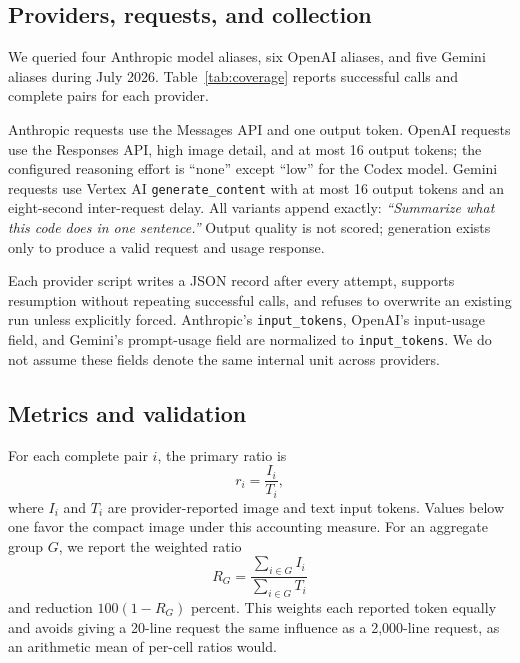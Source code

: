 \documentclass[sigconf,nonacm]{acmart}
\begin{document}
\subsection{Providers, requests, and collection}

We queried four Anthropic model aliases, six OpenAI aliases, and five Gemini
aliases during July 2026. Table~\ref{tab:coverage} reports successful calls and
complete pairs for each provider.

\begin{table}[t]
  \centering
  \caption{Measurement coverage. A complete pair contains successful raw-text
  and compact-image requests for the same provider, model, language, and size.}
  \label{tab:coverage}
  
\end{table}

Anthropic requests use the Messages API and one output token. OpenAI requests
use the Responses API, high image detail, and at most 16 output tokens; the
configured reasoning effort is ``none'' except ``low'' for the Codex model.
Gemini requests use Vertex AI \texttt{generate\_content} with at most 16 output
tokens and an eight-second inter-request delay. All variants append exactly:
\emph{``Summarize what this code does in one sentence.''} Output quality is not
scored; generation exists only to produce a valid request and usage response.

Each provider script writes a JSON record after every attempt, supports
resumption without repeating successful calls, and refuses to overwrite an
existing run unless explicitly forced. Anthropic's \texttt{input\_tokens},
OpenAI's input-usage field, and Gemini's prompt-usage field are normalized to
\texttt{input\_tokens}. We do not assume these fields denote the same internal
unit across providers.

\subsection{Metrics and validation}

For each complete pair $i$, the primary ratio is
\[
  r_i = \frac{I_i}{T_i},
\]
where $I_i$ and $T_i$ are provider-reported image and text input tokens.
Values below one favor the compact image under this accounting measure. For an
aggregate group $G$, we report the weighted ratio
\[
  R_G = \frac{\sum_{i \in G} I_i}{\sum_{i \in G} T_i}
\]
and reduction $100(1-R_G)$ percent. This weights each reported token equally
and avoids giving a 20-line request the same influence as a 2,000-line request,
as an arithmetic mean of per-cell ratios would.
\end{document}
